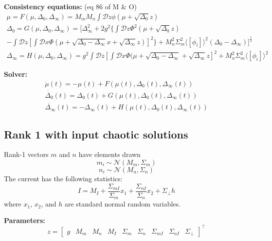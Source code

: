 \documentclass[11pt]{article}
\begin{document}
\textbf{Consistency equations:} (eq 86 of M \& O) \\
\begin{equation}
\begin{split}
 \mu = F(\mu, \Delta_0, \Delta_\infty) = M_m M_n \int \mathcal{D}z \phi(\mu + \sqrt{\Delta_0} z) \\
\Delta_0 = G(\mu, \Delta_0, \Delta_\infty) = [\Delta_\infty^2 + 2g^2\{\int \mathcal{D}z \Phi^2(\mu + \sqrt{\Delta_0}z)  \\
- \int \mathcal{D}z [\int \mathcal{D}x \Phi(\mu + \sqrt{\Delta_0 - \Delta_\infty}x + \sqrt{\Delta_\infty}z)]^2\} +M_n^2 \Sigma_m^2 \langle[\phi_i]\rangle^2(\Delta_0 - \Delta_\infty)]^{\frac{1}{2}} \\
\Delta_\infty = H(\mu, \Delta_0, \Delta_\infty) = g^2 \int \mathcal{D}z \left[ \int \mathcal{D}x \Phi(\mu + \sqrt{\Delta_0 - \Delta_\infty} + \sqrt{\Delta_\infty}z \right]^2 + M_n^2 \Sigma_m^2 \langle [\phi_i] \rangle^2
\end{split}
\end{equation}

\textbf{Solver:}
\begin{equation}
\begin{split}
\dot{\mu}(t) = -\mu(t) + F(\mu(t), \Delta_0(t), \Delta_\infty(t)) \\
\dot{\Delta_0}(t) = \Delta_0(t) + G(\mu(t), \Delta_0(t), \Delta_\infty(t)) \\
\dot{\Delta_\infty}(t) = -\Delta_\infty(t) + H(\mu(t), \Delta_0(t), \Delta_\infty(t))
\end{split}
\end{equation}

\subsection{Rank 1 with input chaotic solutions}
Rank-1 vectors $m$ and $n$ have elements drawn
\[m_i \sim \mathcal{N}(M_m, \Sigma_m)\]
\[n_i \sim \mathcal{N}(M_n, \Sigma_n)\]
The current has the following statistics:
\[I = M_I + \frac{\Sigma_{mI}}{\Sigma_m}x_1 + \frac{\Sigma_{nI}}{\Sigma_n}x_2 + \Sigma_\perp h\]
where $x_1$, $x_2$, and $h$ are standard normal random variables.

\textbf{Parameters:} \\
\[z = \begin{bmatrix} g & M_m & M_n & M_I & \Sigma_m & \Sigma_n & \Sigma_{mI} & \Sigma_{nI} & \Sigma_\perp \end{bmatrix}^\top \]
\end{document}
